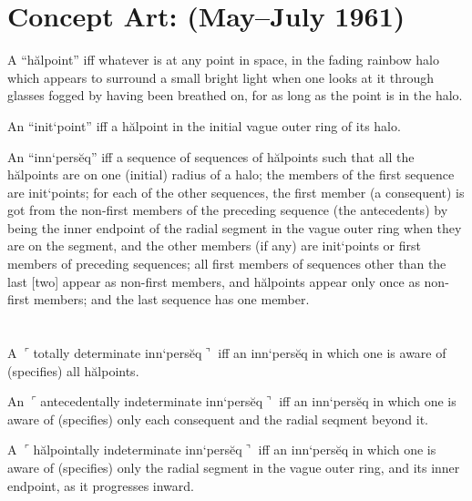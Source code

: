 \section{Concept Art:  (May--July 1961)}

\begin{sysrules}
	A \enquote{h\u{a}lpoint} iff whatever is at any point in space, in the fading rainbow halo 
which appears to surround a small bright light when one looks at it through 
glasses fogged by having been breathed on, for as long as the point is in the 
halo. 

An \enquote{init`point} iff a h\u{a}lpoint in the initial vague outer ring of its halo. 


An \enquote{inn`pers\u{e}q} iff a sequence of sequences of h\u{a}lpoints such that all the 
h\u{a}lpoints are on one (initial) radius of a halo; the members of the first 
sequence are init`points; for each of the other sequences, the first member (a 
consequent) is got from the non-first members of the preceding sequence 
(the antecedents) by being the inner endpoint of the radial segment in the 
vague outer ring when they are on the segment, and the other members (if 
any) are init`points or first members of preceding sequences; all first members 
of sequences other than the last [two] appear as non-first members, and 
h\u{a}lpoints appear only once as non-first members; and the last sequence has 
one member. 
\end{sysrules}

\section{}

\begin{sysrules}
	A $\ulcorner$totally determinate inn`pers\u{e}q$\urcorner$ iff an inn`pers\u{e}q in which one is aware of 
	(specifies) all h\u{a}lpoints. 

	An $\ulcorner$antecedentally indeterminate inn`pers\u{e}q$\urcorner$ iff an inn`pers\u{e}q in which one is 
aware of (specifies) only each consequent and the radial seqment beyond it. 

	A $\ulcorner$h\u{a}lpointally indeterminate inn`pers\u{e}q$\urcorner$ iff an inn`pers\u{e}q in which one is 
aware of (specifies) only the radial segment in the vague outer ring, and its 
inner endpoint, as it progresses inward. 
\end{sysrules}
